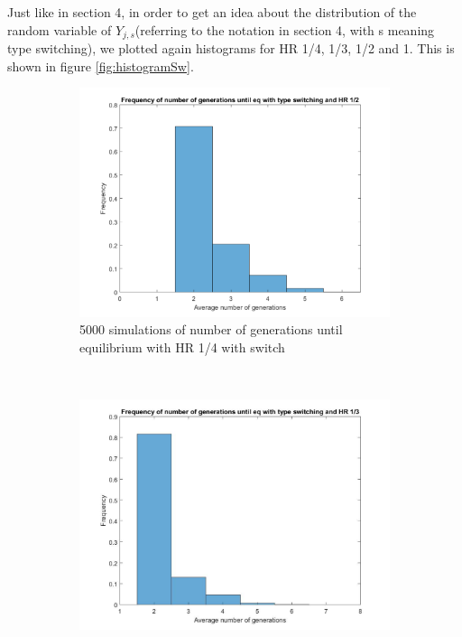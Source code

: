 Just like in section 4, in order to get an idea about the distribution of the random variable of $Y_{j,s}$(referring to the notation in section 4, with s meaning type switching), we plotted again histograms for HR 1/4, 1/3, 1/2 and 1. This is shown in figure \ref{fig:histogramSw}.

\begin{figure}[H]
    \centering
    \begin{subfigure}{0.45\textwidth}
        \includegraphics[width=\textwidth]{AantGen1.pdf}
        \caption{5000 simulations of number of generations until equilibrium with HR 1/4 with switch}
        \label{hists hap 1/4}
    \end{subfigure}
	~
    \begin{subfigure}{0.45\textwidth}
        \includegraphics[width=\textwidth]{AantGen2.pdf}

\end{subfigure}
\end{figure}
